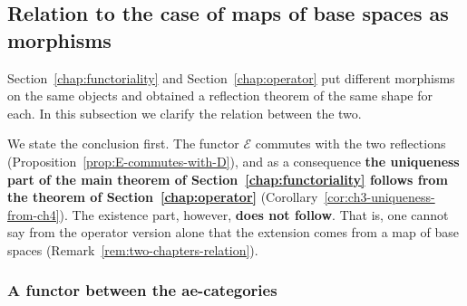 \subsection{Relation to the case of maps of base spaces as morphisms}

Section~\ref{chap:functoriality} and Section~\ref{chap:operator} put different
morphisms on the same objects and obtained a reflection theorem of the same
shape for each.
In this subsection we clarify the relation between the two.

We state the conclusion first.
The functor $\mathcal{E}$ commutes with the two reflections
(Proposition~\ref{prop:E-commutes-with-D}), and as a consequence
\textbf{the uniqueness part of the main theorem of
Section~\ref{chap:functoriality} follows from the theorem of
Section~\ref{chap:operator}}
(Corollary~\ref{cor:ch3-uniqueness-from-ch4}).
The existence part, however, \textbf{does not follow}.
That is, one cannot say from the operator version alone that the extension comes
from a map of base spaces
(Remark~\ref{rem:two-chapters-relation}).

\subsubsection{A functor between the ae-categories}

